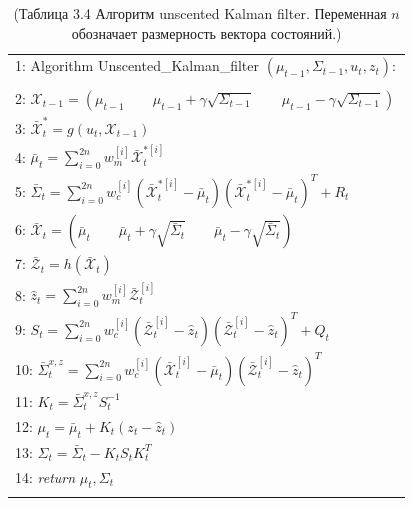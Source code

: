 \documentclass[10pt,a4paper]{article}
\begin{document}
\begin{table}[H]
\begin{center}
\begin{tabular}{|l|}
\hline
1: \hspace{3mm} Algorithm Unscented\_Kalman\_filter $(\mu_{t-1},\varSigma_{t-1},u_t,z_t):$ \\
{}\\
2: \hspace{7mm} 
$\mathcal X_{t-1}=(\mu_{t-1}\qquad\mu_{t-1}+\gamma\sqrt{\varSigma_{t-1}}\qquad\mu_{t-1}-\gamma\sqrt{\varSigma_{t-1}})$\\
3: \hspace{7mm} $\bar{\mathcal X}_t^{*}=g(u_t,\mathcal X_{t-1})$\\
4: \hspace{7mm} $\bar{\mu}_t=\sum\limits_{i=0}^{2n} w_m^{[i]}\bar{\mathcal X}_t^{*[i]}$\\
5: \hspace{7mm} $\bar{\varSigma}_t=\sum\limits_{i=0}^{2n}w_c^{[i]}(\bar{\mathcal X}_t^{*[i]}-\bar{\mu}_t)(\bar{\mathcal X}_t^{*[i]}-\bar{\mu}_t)^T+R_t$\\
6: \hspace{7mm}  $\bar{\mathcal X}_t=(\bar{\mu}_t\qquad\bar{\mu}_t+\gamma\sqrt{\bar{\varSigma}_t}\qquad\bar{\mu}_t-\gamma\sqrt{\bar{\varSigma}_t})$\\
7:  \hspace{8mm}$\bar{\mathcal Z}_t=h(\bar{\mathcal X}_t)$\\
8: \hspace{8mm}$\hat{z}_t=\sum\limits_{i=0}^{2n}w_m^{[i]}\bar{\mathcal Z}_t^{[i]}$\\
9: \hspace{8mm}$S_t=\sum\limits_{i=0}^{2n}w_c^{[i]}(\bar{\mathcal Z}_t^{[i]}-\hat{z}_t)(\bar{\mathcal Z}_t^{[i]}-\hat{z}_t)^T+Q_t$\\
10: \hspace{6mm}$\bar{\varSigma}_t^{x,z}=\sum\limits_{i=0}^{2n}w_c^{[i]}(\bar{\mathcal X}_t^{[i]}-\bar{\mu}_t)(\bar{\mathcal Z}_t^{[i]}-\hat{z}_t)^T$\\
11: \hspace{6mm}$K_t=\bar{\varSigma}_t^{x,z}S_t^{-1}$\\
12: \hspace{6mm}$\mu_t=\bar{\mu}_t+K_t(z_t-\hat{z}_t)$\\
13: \hspace{6mm}$\varSigma_t=\bar{\varSigma}_t-K_t S_t K_t^T$\\

14:\hspace{6mm}
\textit{return} $\mu_t,\varSigma_t$\\
{}\\
\hline
\end{tabular}
\caption{(Таблица 3.4 Алгоритм unscented Kalman filter. Переменная $n$ обозначает размерность вектора состояний.)}
\end{center}
\end{table}
\end{document}
